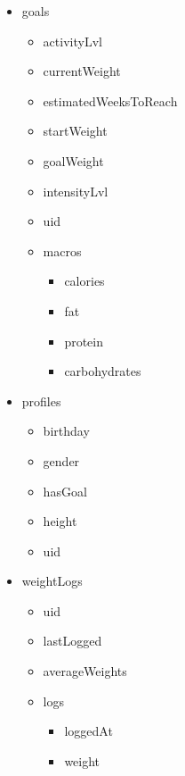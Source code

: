 \documentclass{article}
\begin{document}
        \begin{itemize}
          \item goals
            \begin{itemize}
                \item activityLvl
                \item currentWeight
                \item estimatedWeeksToReach
                \item startWeight
                \item goalWeight
                \item intensityLvl
                \item uid
                \item macros
                    \begin{itemize}
                        \item calories
                        \item fat
                        \item protein
                        \item carbohydrates
                    \end{itemize}
            \end{itemize}
            \hfill \break
          \item profiles
            \begin{itemize}
                \item birthday
                \item gender
                \item hasGoal
                \item height
                \item uid
            \end{itemize}
            \hfill \break
          \item weightLogs
            \begin{itemize}
                \item uid
                \item lastLogged
                \item averageWeights
                \item logs
                    \begin{itemize}
                        \item loggedAt
                        \item weight
                    \end{itemize}
            \end{itemize}
        \end{itemize}
\end{document}
